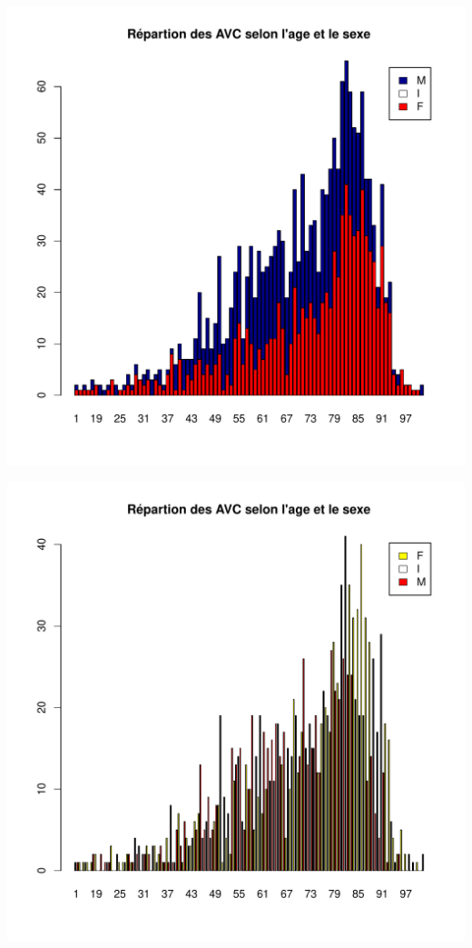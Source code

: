 \documentclass[12pt,english,french,twoside]{report}\usepackage[]{graphicx}\usepackage[]{color}
\makeatletter
\def\maxwidth{ %
  \ifdim\Gin@nat@width>\linewidth
    \linewidth
  \else
    \Gin@nat@width
  \fi
}
\newenvironment{knitrout}{}{} %
\makeatother
\begin{document}
\begin{knitrout}
\includegraphics[width=\maxwidth]{figure/avc_sexe3} 

\includegraphics[width=\maxwidth]{figure/avc_sexe4} 

\end{knitrout}
\end{document}
